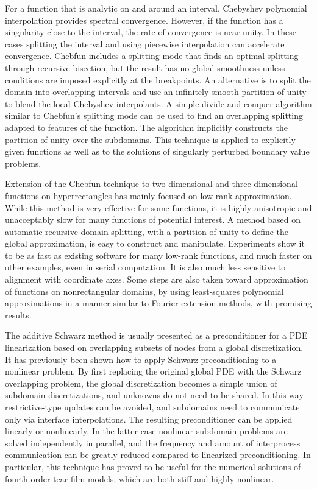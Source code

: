 For a function that is analytic on and around an interval, Chebyshev polynomial
interpolation provides spectral convergence. However, if the function has a singularity close to the
interval, the rate of convergence is near unity. In these cases splitting the interval and using piecewise
interpolation can accelerate convergence. Chebfun includes a splitting mode that finds an optimal
splitting through recursive bisection, but the result has no global smoothness unless conditions are
imposed explicitly at the breakpoints. An alternative is to split the domain into overlapping intervals
and use an infinitely smooth partition of unity to blend the local Chebyshev interpolants. A simple
divide-and-conquer algorithm similar to Chebfun’s splitting mode can be used to find an overlapping
splitting adapted to features of the function. The algorithm implicitly constructs the partition of
unity over the subdomains. This technique is applied to explicitly given functions as well as to the
solutions of singularly perturbed boundary value problems.

Extension of the Chebfun technique to two-dimensional and three-dimensional functions on hyperrectangles has mainly focused on low-rank approximation. While this method is very effective for some functions, it is highly anisotropic and unacceptably slow for many functions of potential interest. A method based on automatic recursive domain splitting, with a partition of unity to define the global approximation, is easy to construct and manipulate. Experiments show it to be as fast as existing software for many low-rank functions, and much faster on other examples, even in serial computation. It is also much less sensitive to alignment with coordinate axes. Some steps are also taken toward approximation of functions on nonrectangular domains, by using least-squares polynomial approximations in a manner similar to Fourier extension methods, with promising results. 

The additive Schwarz method is usually presented as a preconditioner for a PDE linearization based on overlapping subsets of nodes from a global discretization. It has previously been shown how to apply Schwarz preconditioning to a nonlinear problem. By first replacing the original global PDE with the Schwarz overlapping problem, the global discretization becomes a simple union of subdomain discretizations, and unknowns do not need to be shared. In this way restrictive-type updates can be avoided, and subdomains need to communicate only via interface interpolations. The resulting preconditioner can be applied linearly or nonlinearly. In the latter case nonlinear subdomain problems are solved independently in parallel, and the frequency and amount of interprocess communication can be greatly reduced compared to linearized preconditioning. In particular, this technique has proved to be useful for the numerical solutions of fourth order tear film models, which are both stiff and highly nonlinear.

